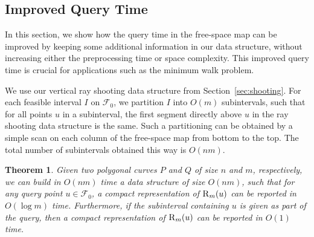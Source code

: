 \documentclass[12pt]{dalthesis}
\newtheorem{theorem}{Theorem}
\newcommand{\REM}[1]{}
\newcommand{\CF}{{\mathscr F}}
\newcommand{\fs}{free-space }
\newcommand{\F}{\CF}
\newcommand{\RE}{\mbox{\sc R}}
\begin{document}
\REM{
The result of this section is summarized below.

\begin{theorem} \label{thm:mainFreeSpaceMap}
	Given two polygonal curves $P$ and $Q$ of size $n$ and $m$, respectively,
	we can build in $O(nm)$ time a data structure of size $O(nm)$, such that
	for any query point $u \in \F_0$, a compact representation of $\RE_m(u)$
	can be reported in $O(m)$ time. \end{theorem}
}





\subsection{Improved Query Time} \label{sec:improved}

In this section, we show how the query time
in the \fs map can be improved
by keeping some additional information in our data structure,
without increasing either the preprocessing time or space complexity.
This improved query time is crucial for 
applications such as the minimum walk problem.

We use our vertical ray shooting data structure from Section~\ref{sec:shooting}.
For each feasible interval $I$ on $\F_0$, 
we partition $I$ into $O(m)$ subintervals, such that
for all points $u$ in a subinterval, 
the first segment directly above $u$ in the ray shooting data structure is the same.
Such a partitioning can be obtained by a simple scan on each column of
the \fs map from bottom to the top.
The total number of subintervals obtained this way is $O(nm)$.
	
\begin{theorem} \label{thm:mainFreeSpaceMap}
	Given two polygonal curves $P$ and $Q$ of size $n$ and $m$, respectively,
	we can build in $O(nm)$ time a data structure of size $O(nm)$, such that
	for any query point $u \in \F_0$, 
	a compact representation of $\RE_m(u)$
	can be reported in $O(\log m)$ time.
	Furthermore, if the subinterval containing $u$ is given as part of the query,
	then a compact representation of $\RE_m(u)$ can be reported in $O(1)$ time.
\end{theorem}
\end{document}
